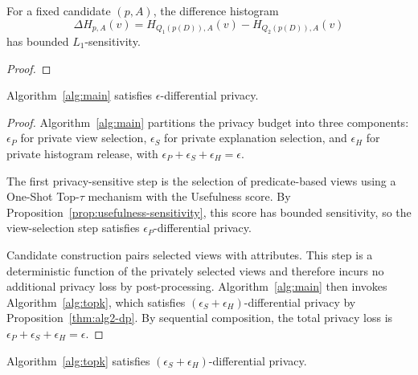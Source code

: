 \begin{proposition}
\label{prop:histogram-release-sensitivity}
For a fixed candidate $(p,A)$, the difference histogram
\[
\Delta H_{p,A}(v)=H_{Q_1(p(D)),A}(v)-H_{Q_2(p(D)),A}(v)
\]
has bounded $L_1$-sensitivity.
\end{proposition}

\begin{proof}
\end{proof}

\begin{proposition}
\label{thm:alg1-dp}
Algorithm~\ref{alg:main} satisfies $\epsilon$-differential privacy.
\end{proposition}

\begin{proof}
Algorithm~\ref{alg:main} partitions the privacy budget into three components: $\epsilon_P$ for private view selection, $\epsilon_S$ for private explanation selection, and $\epsilon_H$ for private histogram release, with $\epsilon_P+\epsilon_S+\epsilon_H=\epsilon$.

The first privacy-sensitive step is the selection of predicate-based views using a One-Shot Top-$\tau$ mechanism with the Usefulness score.
By Proposition~\ref{prop:usefulness-sensitivity}, this score has bounded sensitivity, so the view-selection step satisfies $\epsilon_P$-differential privacy.

Candidate construction pairs selected views with attributes.
This step is a deterministic function of the privately selected views and therefore incurs no additional privacy loss by post-processing.
Algorithm~\ref{alg:main} then invokes Algorithm~\ref{alg:topk}, which satisfies $(\epsilon_S+\epsilon_H)$-differential privacy by Proposition~\ref{thm:alg2-dp}.
By sequential composition, the total privacy loss is $\epsilon_P+\epsilon_S+\epsilon_H=\epsilon$.
\end{proof}

\begin{proposition}
\label{thm:alg2-dp}
Algorithm~\ref{alg:topk} satisfies $(\epsilon_S+\epsilon_H)$-differential privacy.
\end{proposition}

